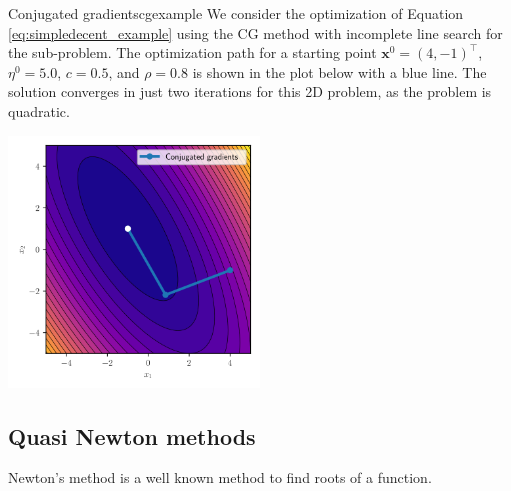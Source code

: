 \begin{example}{Conjugated gradients}{cgexample}
    We consider the optimization of Equation \eqref{eq:simpledecent_example} using the CG method with incomplete line search for the sub-problem. The optimization path for a starting point $\mathbf{x}^0= (4, -1)^\top$, $\eta^0=5.0$, $c=0.5$, and $\rho=0.8$ is shown in the plot below with a blue line. The solution converges in just two iterations for this 2D problem, as the problem is quadratic.
    \begin{center}
        \includegraphics[width=0.5\textwidth]{figures/cg.svg}
    \end{center}   
\end{example}

\subsection{Quasi Newton methods}
Newton's method is a well known method to find roots of a function. 

